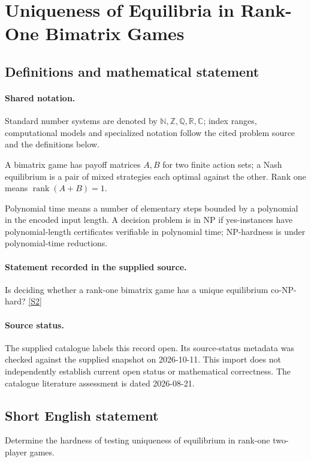 \documentclass[11pt]{article}
\newcommand{\sref}[2]{\hyperlink{source:#1:#2}{[S#2]}}
\begin{document}
\section{Uniqueness of Equilibria in Rank-One Bimatrix Games}\label{statement}

\subsection{Definitions and mathematical statement}

\paragraph{Shared notation.}Standard number systems are denoted by $\mathbb N,\mathbb Z,\mathbb Q,\mathbb R,\mathbb C$; index ranges, computational models and specialized notation follow the cited problem source and the definitions below.


A bimatrix game has payoff matrices $A,B$ for two finite action sets; a Nash equilibrium is a pair of mixed strategies each optimal against the other. Rank one means $\operatorname{rank}(A+B)=1$.

Polynomial time means a number of elementary steps bounded by a polynomial in the encoded input length. A decision problem is in $\mathrm{NP}$ if yes-instances have polynomial-length certificates verifiable in polynomial time; NP-hardness is under polynomial-time reductions.
\paragraph{Statement recorded in the supplied source.}
Is deciding whether a rank-one bimatrix game has a unique equilibrium co-NP-hard? \sref{statement}{2}
\paragraph{Source status.}
The supplied catalogue labels this record open. Its source-status metadata was checked against the supplied snapshot on 2026-10-11. This import does not independently establish current open status or mathematical correctness. The catalogue literature assessment is dated 2026-08-21.
\subsection{Short English statement}
Determine the hardness of testing uniqueness of equilibrium in rank-one two-player games.
\end{document}
